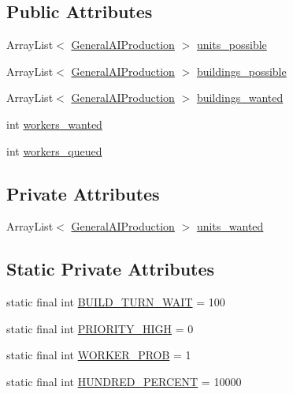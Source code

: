 \subsection*{Public Attributes}
\begin{DoxyCompactItemize}
\item 
ArrayList$<$ \hyperlink{classai_1_1general_1_1_general_a_i_production}{GeneralAIProduction} $>$ \hyperlink{classai_1_1general_1_1_production_manager_aec5af2aa2d240356ddfa8df81d796693}{units\_\-possible}
\item 
ArrayList$<$ \hyperlink{classai_1_1general_1_1_general_a_i_production}{GeneralAIProduction} $>$ \hyperlink{classai_1_1general_1_1_production_manager_a7f3ed3222946fb48beb16c28f4526cb5}{buildings\_\-possible}
\item 
ArrayList$<$ \hyperlink{classai_1_1general_1_1_general_a_i_production}{GeneralAIProduction} $>$ \hyperlink{classai_1_1general_1_1_production_manager_a739ab9ab42cb21183fcbee8fc608a133}{buildings\_\-wanted}
\item 
int \hyperlink{classai_1_1general_1_1_production_manager_a01078f7b8aac811ea7813ad1a3bd9e11}{workers\_\-wanted}
\item 
int \hyperlink{classai_1_1general_1_1_production_manager_a32f144df17dc697bcb9cfa06832497e8}{workers\_\-queued}
\end{DoxyCompactItemize}
\subsection*{Private Attributes}
\begin{DoxyCompactItemize}
\item 
ArrayList$<$ \hyperlink{classai_1_1general_1_1_general_a_i_production}{GeneralAIProduction} $>$ \hyperlink{classai_1_1general_1_1_production_manager_a59ddfa5781a8e7198818bf1c3987b9e3}{units\_\-wanted}
\end{DoxyCompactItemize}
\subsection*{Static Private Attributes}
\begin{DoxyCompactItemize}
\item 
static final int \hyperlink{classai_1_1general_1_1_production_manager_ae8cfbb6431211615a22e08f00559ce3a}{BUILD\_\-TURN\_\-WAIT} = 100
\item 
static final int \hyperlink{classai_1_1general_1_1_production_manager_a96f76dd3e3ab3baaa69b1470a4807984}{PRIORITY\_\-HIGH} = 0
\item 
static final int \hyperlink{classai_1_1general_1_1_production_manager_afe60230ce2b887ac1eb35061f9c0fbaa}{WORKER\_\-PROB} = 1
\item 
static final int \hyperlink{classai_1_1general_1_1_production_manager_abab8287080aab2971b459ab329305aa2}{HUNDRED\_\-PERCENT} = 10000
\end{DoxyCompactItemize}


